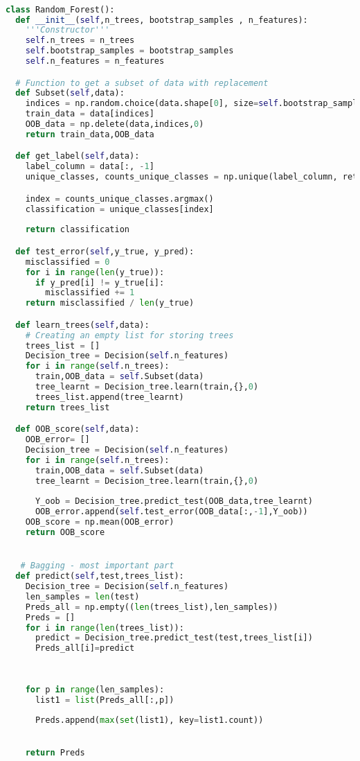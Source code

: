 \documentclass[12pt,letterpaper, onecolumn]{exam}
\begin{document}
\begin{lstlisting}[language=Python, caption=Random Forest Code]

class Random_Forest():
  def __init__(self,n_trees, bootstrap_samples , n_features):
    '''Constructor'''
    self.n_trees = n_trees
    self.bootstrap_samples = bootstrap_samples
    self.n_features = n_features

  # Function to get a subset of data with replacement
  def Subset(self,data):
    indices = np.random.choice(data.shape[0], size=self.bootstrap_samples ,replace = True)
    train_data = data[indices]
    OOB_data = np.delete(data,indices,0)
    return train_data,OOB_data

  def get_label(self,data):
    label_column = data[:, -1]
    unique_classes, counts_unique_classes = np.unique(label_column, return_counts=True)

    index = counts_unique_classes.argmax()
    classification = unique_classes[index]
    
    return classification

  def test_error(self,y_true, y_pred):
    misclassified = 0
    for i in range(len(y_true)):
      if y_pred[i] != y_true[i]:
        misclassified += 1
    return misclassified / len(y_true)

  def learn_trees(self,data):
    # Creating an empty list for storing trees
    trees_list = []
    Decision_tree = Decision(self.n_features)
    for i in range(self.n_trees):
      train,OOB_data = self.Subset(data)
      tree_learnt = Decision_tree.learn(train,{},0)
      trees_list.append(tree_learnt)
    return trees_list

  def OOB_score(self,data):
    OOB_error= []
    Decision_tree = Decision(self.n_features)
    for i in range(self.n_trees):
      train,OOB_data = self.Subset(data)
      tree_learnt = Decision_tree.learn(train,{},0)
      
      Y_oob = Decision_tree.predict_test(OOB_data,tree_learnt)
      OOB_error.append(self.test_error(OOB_data[:,-1],Y_oob))
    OOB_score = np.mean(OOB_error)
    return OOB_score


   # Bagging - most important part
  def predict(self,test,trees_list):
    Decision_tree = Decision(self.n_features)
    len_samples = len(test)
    Preds_all = np.empty((len(trees_list),len_samples))
    Preds = []
    for i in range(len(trees_list)):
      predict = Decision_tree.predict_test(test,trees_list[i])
      Preds_all[i]=predict
    
    
    
    for p in range(len_samples):
      list1 = list(Preds_all[:,p])
      
      Preds.append(max(set(list1), key=list1.count))

    
    return Preds

\end{lstlisting}
\end{document}
